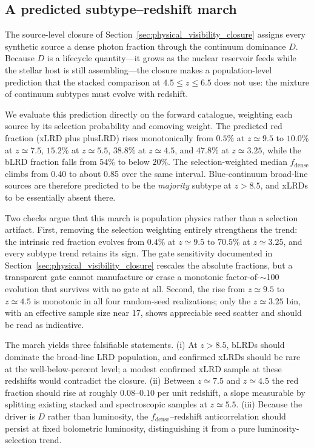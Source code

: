 \subsection{A predicted subtype--redshift march}
\label{sec:subtype_march}

The source-level closure of Section~\ref{sec:physical_visibility_closure}
assigns every synthetic source a dense photon fraction through the continuum
dominance $D$. Because $D$ is a lifecycle quantity---it grows as the nuclear
reservoir feeds while the stellar host is still assembling---the closure makes
a population-level prediction that the stacked comparison at $4.5\leq z\leq6.5$
does not use: the mixture of continuum subtypes must evolve with redshift.

We evaluate this prediction directly on the forward catalogue, weighting each
source by its selection probability and comoving weight. The predicted red
fraction (xLRD plus plusLRD) rises monotonically from $0.5\%$ at $z\simeq9.5$
to $10.0\%$ at $z\simeq7.5$, $15.2\%$ at $z\simeq5.5$, $38.8\%$ at
$z\simeq4.5$, and $47.8\%$ at $z\simeq3.25$, while the bLRD fraction falls
from $54\%$ to below $20\%$. The selection-weighted median
$f_{\mathrm{dense}}$ climbs from 0.40 to about 0.85 over the same interval.
Blue-continuum broad-line sources are therefore predicted to be the
\emph{majority} subtype at $z>8.5$, and xLRDs to be essentially absent there.

Two checks argue that this march is population physics rather than a
selection artifact. First, removing the selection weighting entirely
strengthens the trend: the intrinsic red fraction evolves from $0.4\%$ at
$z\simeq9.5$ to $70.5\%$ at $z\simeq3.25$, and every subtype trend retains its
sign. The gate sensitivity documented in
Section~\ref{sec:physical_visibility_closure} rescales the absolute
fractions, but a transparent gate cannot manufacture or erase a monotonic
factor-of-$\sim$100 evolution that survives with no gate at all. Second, the
rise from $z\simeq9.5$ to $z\simeq4.5$ is monotonic in all four random-seed
realizations; only the $z\simeq3.25$ bin, with an effective sample size near
17, shows appreciable seed scatter and should be read as indicative.

The march yields three falsifiable statements. (i) At $z>8.5$, bLRDs should
dominate the broad-line LRD population, and confirmed xLRDs should be rare at
the well-below-percent level; a modest confirmed xLRD sample at these
redshifts would contradict the closure. (ii) Between $z\simeq7.5$ and
$z\simeq4.5$ the red fraction should rise at roughly $0.08$--$0.10$ per unit
redshift, a slope measurable by splitting existing stacked and spectroscopic
samples at $z\simeq5.5$. (iii) Because the driver is $D$ rather than
luminosity, the $f_{\mathrm{dense}}$--redshift anticorrelation should persist
at fixed bolometric luminosity, distinguishing it from a pure
luminosity-selection trend.

